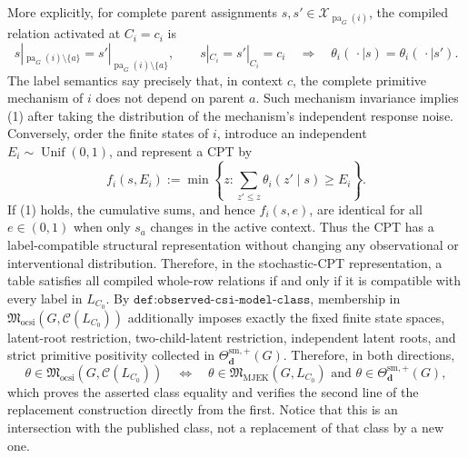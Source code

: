 More explicitly, for complete parent assignments \(s,s'\in\mathcal X_{\operatorname{pa}_G(i)}\), the compiled relation activated at \(C_i=c_i\) is
\[
s|_{\operatorname{pa}_G(i)\setminus\{a\}}
=s'|_{\operatorname{pa}_G(i)\setminus\{a\}},
\qquad
s|_{C_i}=s'|_{C_i}=c_i
\quad\Longrightarrow\quad
\theta_i(\,\cdot\mid s)=\theta_i(\,\cdot\mid s').
\tag{1}
\]
The label semantics say precisely that, in context \(c\), the complete primitive mechanism of \(i\) does not depend on parent \(a\). Such mechanism invariance implies (1) after taking the distribution of the mechanism's independent response noise. Conversely, order the finite states of \(i\), introduce an independent \(E_i\sim\operatorname{Unif}(0,1)\), and represent a CPT by
\[
f_i(s,E_i):=\min\left\{z:\sum_{z'\le z}\theta_i(z'\mid s)\ge E_i\right\}.
\]
If (1) holds, the cumulative sums, and hence \(f_i(s,e)\), are identical for all \(e\in(0,1)\) when only \(s_a\) changes in the active context. Thus the CPT has a label-compatible structural representation without changing any observational or interventional distribution. Therefore, in the stochastic-CPT representation, a table satisfies all compiled whole-row relations if and only if it is compatible with every label in \(L_{C_0}\). By \(\texttt{def:observed-csi-model-class}\), membership in \(\mathfrak M_{\mathrm{ocsi}}(G,\mathcal C(L_{C_0}))\) additionally imposes exactly the fixed finite state spaces, latent-root restriction, two-child-latent restriction, independent latent roots, and strict primitive positivity collected in \(\Theta^{\mathrm{sm},+}_{\mathbf d}(G)\). Therefore, in both directions,
\[
\theta\in\mathfrak M_{\mathrm{ocsi}}\!\left(G,\mathcal C(L_{C_0})\right)
\quad\Longleftrightarrow\quad
\theta\in\mathfrak M_{\mathrm{MJEK}}(G,L_{C_0})
\text{ and }
\theta\in\Theta^{\mathrm{sm},+}_{\mathbf d}(G),
\]
which proves the asserted class equality and verifies the second line of the replacement construction directly from the first. Notice that this is an intersection with the published class, not a replacement of that class by a new one.


